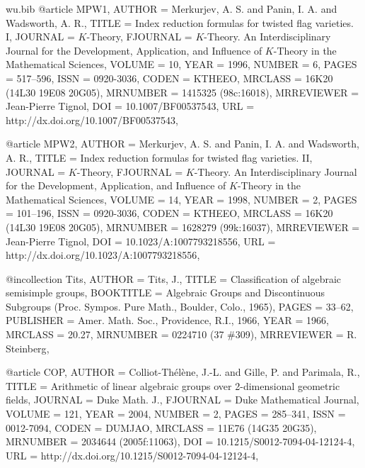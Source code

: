 \documentclass{amsart}
\numberwithin{equation}{section}
\theoremstyle{plain}
\theoremstyle{definition}
\begin{document}
\begin{filecontents}{wu.bib}
@article {MPW1, 
    AUTHOR = {Merkurjev, A. S. and Panin, I. A. and Wadsworth, A. R.},
     TITLE = {Index reduction formulas for twisted flag varieties. {I}},
   JOURNAL = {$K$-Theory},
  FJOURNAL = {$K$-Theory. An Interdisciplinary Journal for the Development,
              Application, and Influence of $K$-Theory in the Mathematical
              Sciences},
    VOLUME = {10},
      YEAR = {1996},
    NUMBER = {6},
     PAGES = {517--596},
      ISSN = {0920-3036},
     CODEN = {KTHEEO},
   MRCLASS = {16K20 (14L30 19E08 20G05)},
  MRNUMBER = {1415325 (98c:16018)},
MRREVIEWER = {Jean-Pierre Tignol},
       DOI = {10.1007/BF00537543},
       URL = {http://dx.doi.org/10.1007/BF00537543},
}

@article {MPW2, 
    AUTHOR = {Merkurjev, A. S. and Panin, I. A. and Wadsworth, A. R.},
     TITLE = {Index reduction formulas for twisted flag varieties. {II}},
   JOURNAL = {$K$-Theory},
  FJOURNAL = {$K$-Theory. An Interdisciplinary Journal for the Development,
              Application, and Influence of $K$-Theory in the Mathematical
              Sciences},
    VOLUME = {14},
      YEAR = {1998},
    NUMBER = {2},
     PAGES = {101--196},
      ISSN = {0920-3036},
     CODEN = {KTHEEO},
   MRCLASS = {16K20 (14L30 19E08 20G05)},
  MRNUMBER = {1628279 (99k:16037)},
MRREVIEWER = {Jean-Pierre Tignol},
       DOI = {10.1023/A:1007793218556},
       URL = {http://dx.doi.org/10.1023/A:1007793218556},
}

@incollection {Tits, 
    AUTHOR = {Tits, J.},
     TITLE = {Classification of algebraic semisimple groups},
 BOOKTITLE = {Algebraic {G}roups and {D}iscontinuous {S}ubgroups ({P}roc.
              {S}ympos. {P}ure {M}ath., {B}oulder, {C}olo., 1965)},
     PAGES = {33--62},
 PUBLISHER = {Amer. Math. Soc., Providence, R.I., 1966},
      YEAR = {1966},
   MRCLASS = {20.27},
  MRNUMBER = {0224710 (37 \#309)},
MRREVIEWER = {R. Steinberg},
}

@article {COP, 
    AUTHOR = {Colliot-Th{\'e}l{\`e}ne, J.-L. and Gille, P. and Parimala, R.},
     TITLE = {Arithmetic of linear algebraic groups over 2-dimensional
              geometric fields},
   JOURNAL = {Duke Math. J.},
  FJOURNAL = {Duke Mathematical Journal},
    VOLUME = {121},
      YEAR = {2004},
    NUMBER = {2},
     PAGES = {285--341},
      ISSN = {0012-7094},
     CODEN = {DUMJAO},
   MRCLASS = {11E76 (14G35 20G35)},
  MRNUMBER = {2034644 (2005f:11063)},
       DOI = {10.1215/S0012-7094-04-12124-4},
       URL = {http://dx.doi.org/10.1215/S0012-7094-04-12124-4},
}


\end{filecontents}
\end{document}
